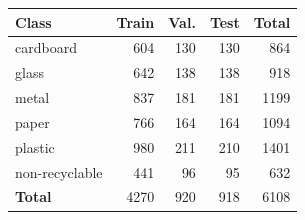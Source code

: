 \begin{tabular}{lrrrr}
\toprule
Class & Train & Val. & Test & Total \\
\midrule
cardboard & 604 & 130 & 130 & 864 \\
glass & 642 & 138 & 138 & 918 \\
metal & 837 & 181 & 181 & 1199 \\
paper & 766 & 164 & 164 & 1094 \\
plastic & 980 & 211 & 210 & 1401 \\
non-recyclable & 441 & 96 & 95 & 632 \\
\textbf{Total} & 4270 & 920 & 918 & 6108 \\
\bottomrule
\end{tabular}

